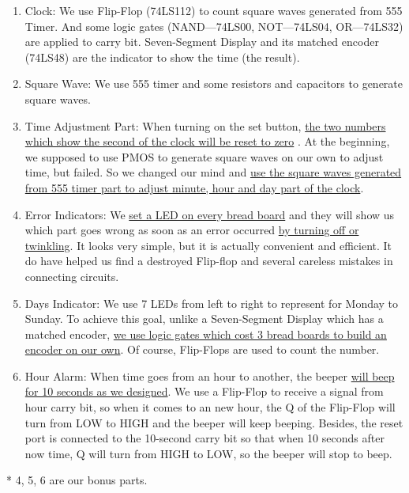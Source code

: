 \documentclass[12pt]{article}
\begin{document}
\begin{enumerate}
	\item Clock: We use Flip-Flop (74LS112) to count square waves generated from 555 Timer. And some logic gates (NAND—74LS00, NOT—74LS04, OR—74LS32) are applied to carry bit. Seven-Segment Display and its matched encoder (74LS48) are the indicator to show the time (the result).
	\item Square Wave: We use 555 timer and some resistors and capacitors to generate square waves.
	\item Time Adjustment Part: When turning on the set button, \uline{the two numbers which show the second of the clock will be reset to zero} . At the beginning, we supposed to use PMOS to generate square waves on our own to adjust time, but failed. So we changed our mind and \uline {use the square waves generated from 555 timer part to adjust minute, hour and day part of the clock}.
	\item Error Indicators: We \uline{set a LED on every bread board} and they will show us which part goes wrong as soon as an error occurred \uline{by turning off or twinkling}. It looks very simple, but it is actually convenient and efficient. It do have helped us find a destroyed Flip-flop and several careless mistakes in connecting circuits.
	\item Days Indicator: We use 7 LEDs from left to right to represent for Monday to Sunday. To achieve this goal, unlike a Seven-Segment Display which has a matched encoder, \uline{we use logic gates which cost 3 bread boards to build an encoder on our own}. Of course, Flip-Flops are used to count the number.
	\item Hour Alarm: When time goes from an hour to another, the beeper \uline{will beep for 10 seconds as we designed}. We use a Flip-Flop to receive a signal from hour carry bit, so when it comes to an new hour, the Q of the Flip-Flop will turn from LOW to HIGH and the beeper will keep beeping. Besides, the reset port is connected to the 10-second carry bit so that when 10 seconds after now time, Q will turn from HIGH to LOW, so the beeper will stop to beep.
\end{enumerate}
* 4, 5, 6 are our bonus parts.
\end{document}
